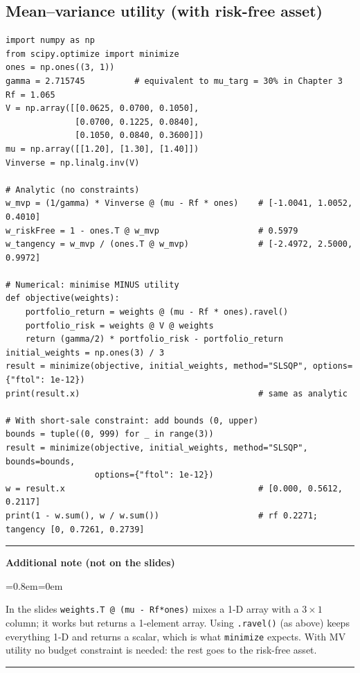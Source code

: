 \documentclass[11pt,a4paper]{report}
\newenvironment{notebox}[1]
  {\par\medskip\Needspace{6\baselineskip}\noindent\rule{\linewidth}{0.4pt}\par\nopagebreak
   \noindent\textbf{#1}\par\nopagebreak
   \begin{list}{}{\leftmargin=0.8em\rightmargin=0em\topsep=2pt}\item[]}
  {\end{list}\nopagebreak\noindent\rule{\linewidth}{0.4pt}\par\medskip}
\newenvironment{addnote}{\begin{notebox}{Additional note (not on the slides)}}{\end{notebox}}
\begin{document}
\subsection{Mean--variance utility (with risk-free asset)}
\begin{lstlisting}
import numpy as np
from scipy.optimize import minimize
ones = np.ones((3, 1))
gamma = 2.715745          # equivalent to mu_targ = 30% in Chapter 3
Rf = 1.065
V = np.array([[0.0625, 0.0700, 0.1050],
              [0.0700, 0.1225, 0.0840],
              [0.1050, 0.0840, 0.3600]])
mu = np.array([[1.20], [1.30], [1.40]])
Vinverse = np.linalg.inv(V)

# Analytic (no constraints)
w_mvp = (1/gamma) * Vinverse @ (mu - Rf * ones)    # [-1.0041, 1.0052, 0.4010]
w_riskFree = 1 - ones.T @ w_mvp                    # 0.5979
w_tangency = w_mvp / (ones.T @ w_mvp)              # [-2.4972, 2.5000, 0.9972]

# Numerical: minimise MINUS utility
def objective(weights):
    portfolio_return = weights @ (mu - Rf * ones).ravel()
    portfolio_risk = weights @ V @ weights
    return (gamma/2) * portfolio_risk - portfolio_return
initial_weights = np.ones(3) / 3
result = minimize(objective, initial_weights, method="SLSQP", options={"ftol": 1e-12})
print(result.x)                                    # same as analytic

# With short-sale constraint: add bounds (0, upper)
bounds = tuple((0, 999) for _ in range(3))
result = minimize(objective, initial_weights, method="SLSQP", bounds=bounds,
                  options={"ftol": 1e-12})
w = result.x                                       # [0.000, 0.5612, 0.2117]
print(1 - w.sum(), w / w.sum())                    # rf 0.2271; tangency [0, 0.7261, 0.2739]
\end{lstlisting}
\begin{addnote}
In the slides \texttt{weights.T @ (mu - Rf*ones)} mixes a 1-D array with a
$3\times1$ column; it works but returns a 1-element array. Using \texttt{.ravel()}
(as above) keeps everything 1-D and returns a scalar, which is what
\texttt{minimize} expects. With MV utility no budget constraint is needed: the
rest goes to the risk-free asset.
\end{addnote}
\end{document}

